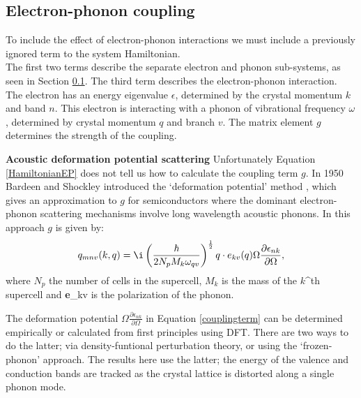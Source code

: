 
\subsection{Electron-phonon coupling}
To include the effect of electron-phonon interactions we must include a previously ignored term to the system Hamiltonian.
\begin{equation} \label{HamiltonianEP}
    
\end{equation}
The first two terms describe the separate electron and phonon sub-systems, as seen in Section \ref{}. The third term describes the electron-phonon interaction. The electron has an energy eigenvalue $\epsilon$, determined by the crystal momentum $k$ and band $n$. This electron is interacting with a phonon of vibrational frequency $\omega$  , determined by crystal momentum $q$ and branch $v$. The matrix element $g$ determines the strength of the coupling. 


\textbf{Acoustic deformation potential scattering}
Unfortunately Equation \ref{HamiltonianEP} does not tell us how to calculate the coupling term $g$. In 1950 Bardeen and Shockley introduced the `deformation potential' method \cite{}, which gives an approximation to $g$ for semiconductors where the dominant electron-phonon scattering mechanisms involve long wavelength acoustic phonons.\cite{Giustino2016} In this approach $g$ is given by:
\begin{equation} \label{couplingterm}
   q_{mnv}(k,q) = \i\left(\frac{\hbar}{2N_pM_k\omega_{qv}}\right)^{\frac{1}{2}}q\cdot e_{kv}(q) \Omega\frac{\partial\epsilon_{nk}}{\partial\Omega},
\end{equation}
where $N_p$ the number of cells in the supercell, $M_k$ is the mass of the $k$^{th} supercell and \textbf{e}_{kv} is the polarization of the phonon. 

The deformation potential $\Omega\frac{\partial\epsilon_{nk}}{\partial\Omega}$ in Equation \ref{couplingterm} can be determined empirically or calculated from first principles using DFT. There are two ways to do the latter; via density-funtional perturbation theory, or using the `frozen-phonon' approach. The results here use the latter; the energy of the valence and conduction bands are tracked as the crystal lattice is distorted along a single phonon mode. 

